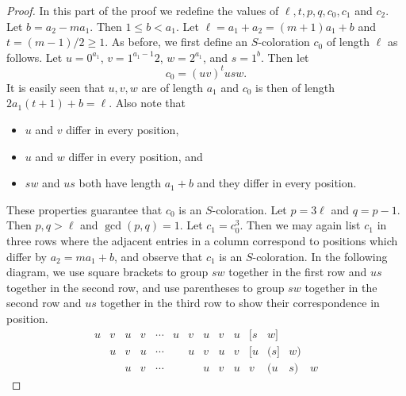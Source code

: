 \documentclass[11pt]{amsart}
\theoremstyle{definition}
\begin{document}
\begin{proof}
In this part of the proof we redefine the values of $\ell, t, p, q, c_0, c_1$ and $c_2$. Let $b=a_2-ma_1$. Then $1\leq b<a_1$. Let $\ell=a_1+a_2=(m+1)a_1+b$ and $t=(m-1)/2\geq 1$. As before, we first define an $S$-coloration $c_0$ of length $\ell$ as follows. Let $u=0^{a_1}$, $v=1^{a_1-1}2$, $w=2^{a_1}$, and $s=1^b$. Then let
$$ c_0=(uv)^t usw. $$
It is easily seen that $u,v,w$ are of length $a_1$ and $c_0$ is then of length $2a_1(t+1)+b=\ell$. Also note that 
\begin{itemize}
\item $u$ and $v$ differ in every position,
\item $u$ and $w$ differ in every position, and
\item $sw$ and $us$ both have length $a_1+b$ and they differ in every position. 
\end{itemize}
These properties guarantee that $c_0$ is an $S$-coloration. Let $p=3\ell$ and $q=p-1$. Then $p, q>\ell$ and $\gcd(p, q)=1$. Let $c_1=c_0^3$. Then we may again list $c_1$ in three rows where the adjacent entries in a column correspond to positions which differ by $a_2=ma_1+b$, and observe that $c_1$ is an $S$-coloration. In the following diagram, we use square brackets to group $sw$ together in the first row and $us$ together in the second row, and use parentheses to group $sw$ together in the second row and $us$ together in the third row to show their correspondence in position.
$$  \begin{array}{rccccccccccccl}
u & v & u & v & \cdots & u & v & u & v & u & [s & w] &  & \\
   & u & v & u & \cdots &    & u & v & u & v & [u & (s] & w) & \\
   &    & u & v & \cdots &    &    & u & v & u & v & (u & s) & w
   \end{array}
   $$


\end{proof}
\end{document}
